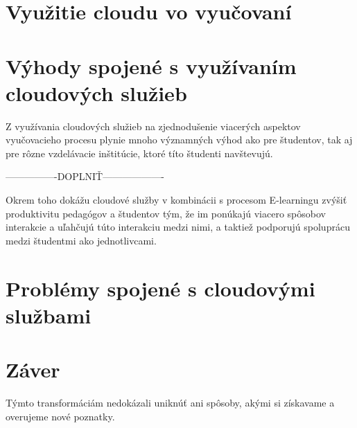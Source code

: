 \documentclass[10pt,slovak,a4paper]{article}%
\begin{document}
\section{Využitie cloudu vo vyučovaní}


\section{Výhody spojené s využívaním cloudových služieb}


Z využívania cloudových služieb na zjednodušenie viacerých aspektov vyučovacieho procesu plynie mnoho významných výhod ako pre študentov, tak aj pre rôzne vzdelávacie inštitúcie, ktoré títo študenti navštevujú.

----------------DOPLNIŤ-------------------

Okrem toho dokážu cloudové služby v kombinácii s procesom E-learningu zvýšiť produktivitu pedagógov a študentov tým, že im ponúkajú viacero spôsobov interakcie a uľahčujú túto interakciu medzi nimi, a taktiež podporujú spoluprácu medzi študentmi ako jednotlivcami\cite{Mhouti_benefits_challenges}.

\section{Problémy spojené s cloudovými službami}


\section{Záver}


Týmto transformáciám nedokázali uniknúť ani spôsoby, akými si získavame a overujeme nové poznatky.





\end{document}
